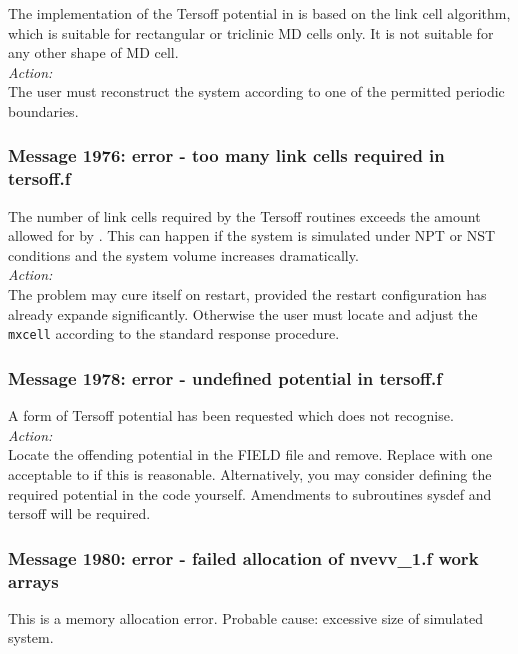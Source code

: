 The implementation of the Tersoff potential in \D{} is based on the link
cell algorithm, which is suitable for rectangular or triclinic MD
cells only. It is not suitable for any other shape of MD cell.
\\
\noindent
{\em Action:} \\
The user must reconstruct the system according to one of the permitted
periodic boundaries.
\\

\subsubsection*{Message 1976: error - too many link cells required in
tersoff.f}

The number of link cells required by the Tersoff routines exceeds the
amount allowed for by \D{}. This can happen if the system is simulated
under NPT or NST conditions and the system volume increases dramatically.
\\
\noindent
{\em Action:} \\ The problem may cure itself on restart, provided the
restart configuration has already expande significantly. Otherwise the
user must locate and adjust the {\tt mxcell} according to the standard
response procedure.
\\

\subsubsection*{Message 1978: error - undefined potential in
tersoff.f}

A form of Tersoff potential has been requested which
\D{} does not recognise.  \\

\noindent
{\em Action:} \\ Locate the offending potential in the FIELD file and
remove. Replace with one acceptable to \D{} if this is
reasonable. Alternatively, you may consider defining the required
potential in the code yourself. Amendments to subroutines {\sc sysdef}
and {\sc tersoff} will be required.
\\

\subsubsection*{Message 1980: error - failed allocation of nvevv\_1.f
work arrays}

This is a memory allocation error. Probable cause: excessive size of
simulated system. \\

